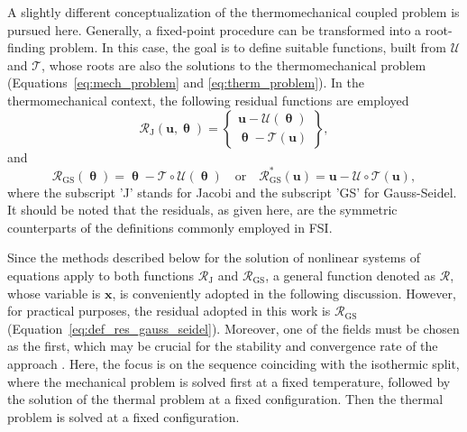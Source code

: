 A slightly different conceptualization of the thermomechanical coupled problem is pursued here.
Generally, a fixed-point procedure can be transformed into a root-finding problem.
In this case, the goal is to define suitable functions, built from \(\bm{\mathcal{U}}\) and \(\bm{\mathcal{T}}\), whose roots are also the solutions to the thermomechanical problem (Equations~\eqref{eq:mech_problem} and \eqref{eq:therm_problem}).
In the thermomechanical context, the following residual functions are employed
\begin{equation} \label{eq:def_res_jacobi}
  \bm{\mathcal{R}}_\text{J}(\mathbf{u}, \bm{\uptheta}) =
  \left\{\begin{array}{c}
           \mathbf{u} - \bm{\mathcal{U}}(\bm{\uptheta})\\
           \bm{\uptheta} - \bm{\mathcal{T}}(\mathbf{u})
         \end{array}\right\},
     \end{equation}
     and
     \begin{equation} \label{eq:def_res_gauss_seidel}
       \bm{\mathcal{R}}_\text{GS}(\bm{\uptheta}) =
       \bm{\uptheta} - \bm{\mathcal{T}}\circ \bm{\mathcal{U}}(\bm{\uptheta}) \quad \text{or} \quad \bm{\mathcal{R}}^*_\text{GS}(\mathbf{u}) =
       \mathbf{u} - \bm{\mathcal{U}}\circ \bm{\mathcal{T}}(\mathbf{u}),
     \end{equation}
     where the subscript 'J' stands for Jacobi and the subscript 'GS' for Gauss-Seidel.
     It should be noted that the residuals, as given here, are the symmetric counterparts of the definitions commonly employed in FSI.

     Since the methods described below for the solution of nonlinear systems of equations apply to both functions \(\bm{\mathcal{R}}_\mathrm{J}\) and \(\bm{\mathcal{R}}_\mathrm{GS}\), a general function denoted as \(\bm{\mathcal{R}}\), whose variable is \(\mathbf{x}\), is conveniently adopted in the following discussion.
     However, for practical purposes, the residual adopted in this work is \(\bm{\mathcal{R}}_\text{GS}\) (Equation~\eqref{eq:def_res_gauss_seidel}).
     Moreover, one of the fields must be chosen as the first, which may be crucial for the stability and convergence rate of the approach \citep{joosten_analysis_2009}.
     Here, the focus is on the sequence coinciding with the isothermic split, where the mechanical problem is solved first at a fixed temperature, followed by the solution of the thermal problem at a fixed configuration.
     Then the thermal problem is solved at a fixed configuration.


